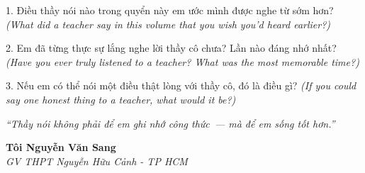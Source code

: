 \begin{tuhocnhanh}
1. Điều thầy nói nào trong quyển này em ước mình được nghe từ sớm hơn? \textit{(What did a teacher say in this volume that you wish you'd heard earlier?)}

2. Em đã từng thực sự lắng nghe lời thầy cô chưa? Lần nào đáng nhớ nhất? \textit{(Have you ever truly listened to a teacher? What was the most memorable time?)}

3. Nếu em có thể nói một điều thật lòng với thầy cô, đó là điều gì? \textit{(If you could say one honest thing to a teacher, what would it be?)}
\end{tuhocnhanh}

\begin{center}
\textit{\color{softcopper}``Thầy nói không phải để em ghi nhớ công thức~--- mà để em sống tốt hơn.''}
\end{center}

\begin{flushright}
\textbf{Tôi Nguyễn Văn Sang}\\
\textit{GV THPT Nguyễn Hữu Cảnh - TP HCM}
\end{flushright}

\ngancach
